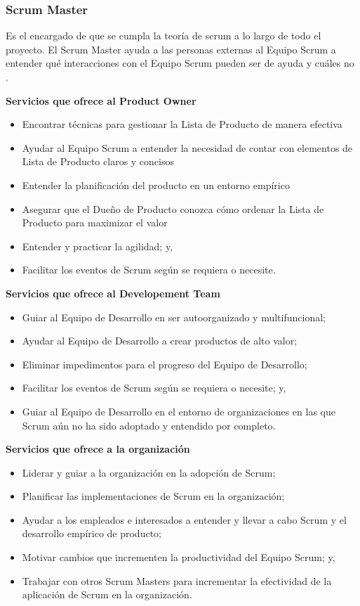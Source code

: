 \subsubsection{Scrum Master}

Es el encargado de que se cumpla la teoría de scrum a lo largo de todo el proyecto. El Scrum Master ayuda a las personas externas al Equipo Scrum a entender qué interacciones con el Equipo Scrum pueden ser de ayuda y cuáles no \cite{scrum_guide}.

\textbf{Servicios que ofrece al Product Owner}
	
\begin{itemize}
		  \item Encontrar técnicas para gestionar la Lista de Producto de manera efectiva
		  \item Ayudar al Equipo Scrum a entender la necesidad de contar con elementos de Lista de Producto claros y concisos
		  \item Entender la planificación del producto en un entorno empírico
		  \item Asegurar que el Dueño de Producto conozca cómo ordenar la Lista de Producto para maximizar el valor
		  \item Entender y practicar la agilidad; y,
		  \item Facilitar los eventos de Scrum según se requiera o necesite.
\end{itemize}
		\cite{scrum_guide}

\textbf{Servicios que ofrece al Developement Team}
	
\begin{itemize}
		  \item Guiar al Equipo de Desarrollo en ser autoorganizado y multifuncional;
		  \item Ayudar al Equipo de Desarrollo a crear productos de alto valor;
		  \item Eliminar impedimentos para el progreso del Equipo de Desarrollo;
		  \item Facilitar los eventos de Scrum según se requiera o necesite; y,
		  \item Guiar al Equipo de Desarrollo en el entorno de organizaciones en las que Scrum aún no ha sido adoptado y entendido por completo.
\end{itemize}
		\cite{scrum_guide}

\textbf{Servicios que ofrece a la organización}
	
\begin{itemize}
		  \item Liderar y guiar a la organización en la adopción de Scrum;
		  \item Planificar las implementaciones de Scrum en la organización; 
		  \item Ayudar a los empleados e interesados a entender y llevar a cabo Scrum y el desarrollo empírico de producto;
		  \item Motivar cambios que incrementen la productividad del Equipo Scrum; y,
		  \item Trabajar con otros Scrum Masters para incrementar la efectividad de la aplicación de Scrum en la organización.
\end{itemize}
		\cite{scrum_guide}
		

